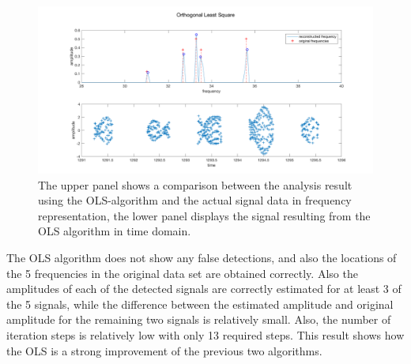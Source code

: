 \begin{figure}[H]
	\centering
		\includegraphics[width=\textwidth]{images/ols}
		\caption{The upper panel shows a comparison between the analysis result using the OLS-algorithm and the actual signal data in frequency representation, the lower panel displays the signal resulting from the OLS algorithm in time domain.}
		\label{fig:ols}
\end{figure}

The OLS algorithm does not show any false detections, and also the locations of the 5 frequencies in the original data set are obtained correctly. Also the amplitudes of each of the detected signals are correctly estimated for at least 3 of the 5 signals, while the difference between the estimated amplitude and original amplitude for the remaining two signals is relatively small. Also, the number of iteration steps is relatively low with only 13 required steps. This result shows how the OLS is a strong improvement of the previous two algorithms.





